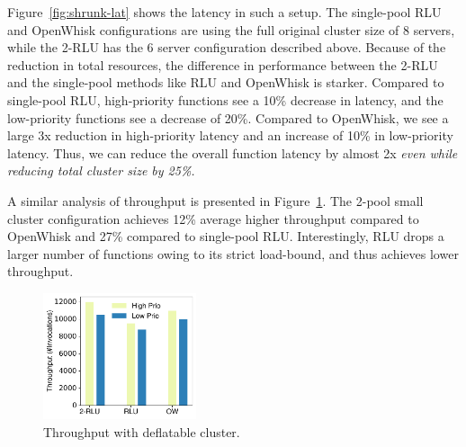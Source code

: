Figure~\ref{fig:shrunk-lat} shows the latency in such a setup.
The single-pool RLU and OpenWhisk configurations are using the full original cluster size of 8 servers, while the 2-RLU has the 6 server configuration described above. 
Because of the reduction in total resources, the difference in performance between the 2-RLU and the single-pool methods like RLU and OpenWhisk is starker.
Compared to single-pool RLU, high-priority functions see a  10\% decrease in latency, and the low-priority functions see a decrease of 20\%.
Compared to OpenWhisk, we see a large 3x reduction in high-priority latency and an increase of 10\% in low-priority latency.
Thus, we can reduce the overall function latency by almost 2x \emph{even while reducing total cluster size by 25\%.}


A similar analysis of throughput is presented in Figure~\ref{fig:shrunk-tput}. 
The 2-pool small cluster configuration achieves 12\% average higher throughput compared to OpenWhisk and 27\% compared to single-pool RLU.
Interestingly, RLU drops a larger number of functions owing to its strict load-bound, and thus achieves lower throughput. 


\begin{figure}
  \centering
  \includegraphics[width=0.4\textwidth]{../Figures/fixed/tput2.pdf} %
  \caption[fixed-tput]{Throughput with deflatable cluster.}
  \label{fig:shrunk-tput}
\end{figure}




